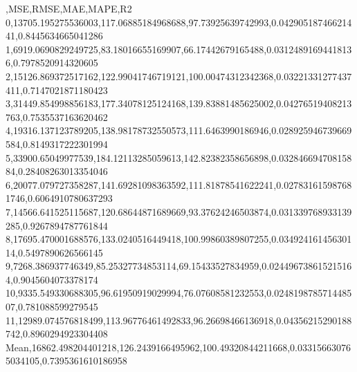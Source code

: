 ,MSE,RMSE,MAE,MAPE,R2
0,13705.195275536003,117.06885184968688,97.73925639742993,0.04290518746621441,0.8445634665041286
1,6919.0690829249725,83.18016655169907,66.17442679165488,0.03124891694418136,0.7978520914320605
2,15126.869372517162,122.99041746719121,100.00474312342368,0.03221331277437411,0.7147021871180423
3,31449.854998856183,177.34078125124168,139.83881485625002,0.04276519408213763,0.7535537163620462
4,19316.137123789205,138.98178732550573,111.6463990186946,0.028925946739669584,0.8149317222301994
5,33900.65049977539,184.12113285059613,142.82382358656898,0.03284669470815884,0.28408263013354046
6,20077.079727358287,141.69281098363592,111.81878541622241,0.027831615987681746,0.6064910780637293
7,14566.641525115687,120.68644871689669,93.37624246503874,0.031339768933139285,0.9267894787761844
8,17695.470001688576,133.0240516449418,100.99860389807255,0.03492416145630114,0.5497890626566145
9,7268.386937746349,85.25327734853114,69.15433527834959,0.024496738615215164,0.9045604073378174
10,9335.549330688305,96.61950919029994,76.07608581232553,0.024819878571448507,0.781088599279545
11,12989.074576818499,113.96776461492833,96.26698466136918,0.04356215290188742,0.8960294923304408
Mean,16862.498204401218,126.2439166495962,100.49320844211668,0.033156630765034105,0.7395361610186958
